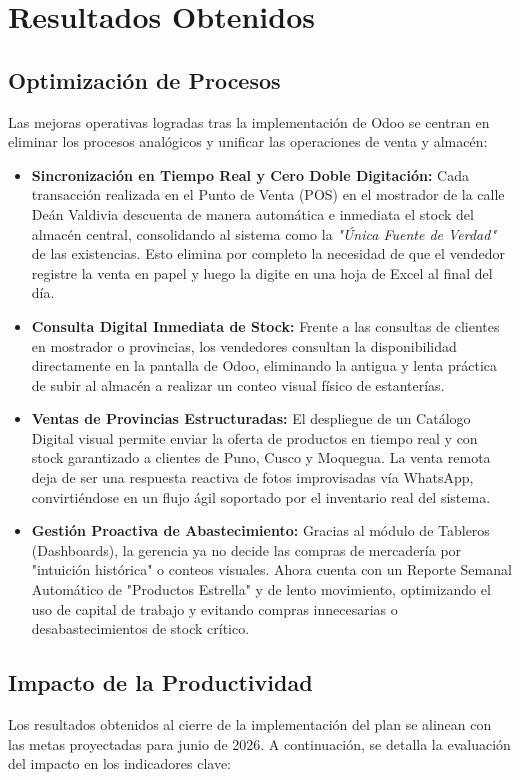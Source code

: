 \section{Resultados Obtenidos}

\subsection{Optimización de Procesos}
Las mejoras operativas logradas tras la implementación de Odoo se centran en eliminar los procesos analógicos y unificar las operaciones de venta y almacén:

\begin{itemize}
    \item \textbf{Sincronización en Tiempo Real y Cero Doble Digitación:} Cada transacción realizada en el Punto de Venta (POS) en el mostrador de la calle Deán Valdivia descuenta de manera automática e inmediata el stock del almacén central, consolidando al sistema como la \textit{"Única Fuente de Verdad"} de las existencias. Esto elimina por completo la necesidad de que el vendedor registre la venta en papel y luego la digite en una hoja de Excel al final del día.
    \item \textbf{Consulta Digital Inmediata de Stock:} Frente a las consultas de clientes en mostrador o provincias, los vendedores consultan la disponibilidad directamente en la pantalla de Odoo, eliminando la antigua y lenta práctica de subir al almacén a realizar un conteo visual físico de estanterías.
    \item \textbf{Ventas de Provincias Estructuradas:} El despliegue de un Catálogo Digital visual permite enviar la oferta de productos en tiempo real y con stock garantizado a clientes de Puno, Cusco y Moquegua. La venta remota deja de ser una respuesta reactiva de fotos improvisadas vía WhatsApp, convirtiéndose en un flujo ágil soportado por el inventario real del sistema.
    \item \textbf{Gestión Proactiva de Abastecimiento:} Gracias al módulo de Tableros (Dashboards), la gerencia ya no decide las compras de mercadería por "intuición histórica" o conteos visuales. Ahora cuenta con un Reporte Semanal Automático de "Productos Estrella" y de lento movimiento, optimizando el uso de capital de trabajo y evitando compras innecesarias o desabastecimientos de stock crítico.
\end{itemize}

\subsection{Impacto de la Productividad}
Los resultados obtenidos al cierre de la implementación del plan se alinean con las metas proyectadas para junio de 2026. A continuación, se detalla la evaluación del impacto en los indicadores clave:

